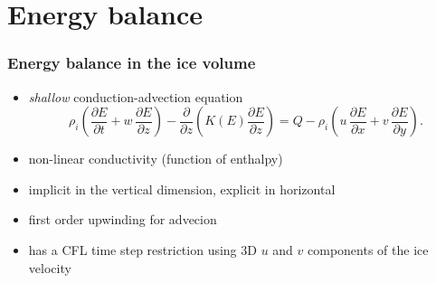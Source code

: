\documentclass[hide notes,intlimits]{beamer}
\newcommand{\diff}[2]{\frac{\partial #1}{\partial #2}}
\begin{document}
\section{Energy balance}
\label{sec:energy-balance}

\begin{frame}
  \frametitle{Energy balance in the ice volume}
  \begin{itemize}
  \item \emph{shallow} conduction-advection equation
    \begin{equation}
      \label{eq:1}
  \rho_{i} \left( \diff{E}{t} + w\,\diff{E}{z} \right) - \diff{}{z}\left( K(E) \diff{E}{z} \right) = Q - \rho_{i} \left( u\,\diff{E}{x} + v\,\diff{E}{y} \right).
    \end{equation}
  \item non-linear conductivity (function of enthalpy)
  \item implicit in the vertical dimension, explicit in horizontal
  \item first order upwinding for advecion
  \item has a CFL time step restriction using 3D $u$ and $v$
    components of the ice velocity
  \end{itemize}
\end{frame}

\end{document}
